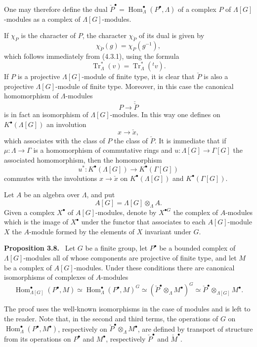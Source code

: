 \documentclass[11pt]{article}
\newenvironment{statement}[1]{\par\medskip\noindent\textbf{#1.}\ }{\par\medskip}
\DeclareMathOperator{\Hom}{Hom}
\providecommand{\Tr}{\operatorname{Tr}}
\providecommand{\Tr}{\operatorname{Tr}}
\providecommand{\Tr}{\operatorname{Tr}}
\providecommand{\Hom}{\operatorname{Hom}}
\providecommand{\Tr}{\operatorname{Tr}}
\providecommand{\Hom}{\operatorname{Hom}}
\providecommand{\Tr}{\operatorname{Tr}}
\begin{document}
One may therefore define the dual $\check P^\bullet=\Hom_\Lambda^\bullet(P^\bullet,\Lambda)$ of a complex $P$ of $\Lambda[G]$-modules as a complex of $\Lambda[G]$-modules.

If $\chi_P$ is the character of $P$, the character $\chi_{\check P}$ of its dual is given by
\[
\chi_{\check P}(g)=\chi_P(g^{-1}),
\tag{3.7.2}
\]
which follows immediately from (4.3.1), using the formula
\[
\Tr_\Lambda^*(v)=\Tr_\Lambda^*({}^{t}v).
\]
If $P$ is a projective $\Lambda[G]$-module of finite type, it is clear that $\check P$ is also a projective $\Lambda[G]$-module of finite type. Moreover, in this case the canonical homomorphism of $\Lambda$-modules
\[
P\longrightarrow\check{\check P}
\]
is in fact an isomorphism of $\Lambda[G]$-modules. In this way one defines on $K^{\bullet}(\Lambda[G])$ an involution
\[
x\longrightarrow \check x,
\]
which associates with the class of $P$ the class of $\check P$. It is immediate that if $\mu:\Lambda\to\Gamma$ is a homomorphism of commutative rings and $u:\Lambda[G]\to\Gamma[G]$ the associated homomorphism, then the homomorphism
\[
u^*:K^{\bullet}(\Lambda[G])\longrightarrow K^{\bullet}(\Gamma[G])
\]
commutes with the involutions $x\longrightarrow\check x$ on $K^{\bullet}(\Lambda[G])$ and $K^{\bullet}(\Gamma[G])$.

Let $A$ be an algebra over $\Lambda$, and put
\[
A[G]=\Lambda[G]\otimes_\Lambda A.
\]
Given a complex $X^\bullet$ of $A[G]$-modules, denote by $X^{\bullet G}$ the complex of $A$-modules which is the image of $X^\bullet$ under the functor that associates to each $A[G]$-module $X$ the $A$-module formed by the elements of $X$ invariant under $G$.

\begin{statement}{Proposition 3.8}
Let $G$ be a finite group, let $P^\bullet$ be a bounded complex of $\Lambda[G]$-modules all of whose components are projective of finite type, and let $M$ be a complex of $A[G]$-modules. Under these conditions there are canonical isomorphisms of complexes of $A$-modules
\[
\Hom_{\Lambda[G]}^\bullet(P^\bullet,M)
\simeq \Hom_\Lambda^\bullet(P^\bullet,M)^G
\simeq (\check P^\bullet\otimes_\Lambda M^\bullet)^G
\simeq \check P^\bullet\otimes_{\Lambda[G]}M^\bullet.
\tag{3.8.1}
\]
\end{statement}

The proof uses the well-known isomorphisms in the case of modules and is left to the reader. Note that, in the second and third terms, the operations of $G$ on $\Hom_\Lambda^\bullet(P^\bullet,M^\bullet)$, respectively on $\check P^\bullet\otimes_\Lambda M^\bullet$, are defined by transport of structure from its operations on $P^\bullet$ and $M^\bullet$, respectively $\check P^\bullet$ and $\check{M}^\bullet$.
\end{document}

